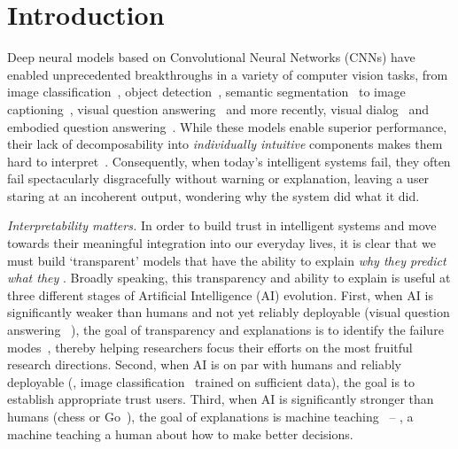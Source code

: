 \vspace{-15pt}
\section{Introduction}
Deep neural models based on Convolutional Neural Networks (CNNs)
have enabled unprecedented breakthroughs in a variety of computer vision tasks, from image
classification~\cite{krizhevsky_nips12,he_cvpr15}, object detection~\cite{girshick2014rcnn}, semantic segmentation~\cite{long2015fcn} to image captioning~\cite{vinyals_cvpr15,chen2015microsoft,fang2015captions,johnson_cvpr16}, visual question answering~\cite{antol2015vqa,gao2015you,malinowski_iccv15,ren_nips15}
and more recently, visual dialog~\cite{visdial,guesswhat,visdial_rl} and
embodied question answering~\cite{embodiedqa,gordon2017iqa}.
While these models enable superior performance, their lack of decomposability into
\emph{individually intuitive} components makes them hard to interpret~\cite{lipton_arxiv16}.
Consequently, when today's intelligent systems fail, they often fail spectacularly disgracefully
without warning or explanation, leaving a user staring at an incoherent output, wondering why the system did what it did.  %


\emph{Interpretability matters.}
In order to build trust in intelligent systems and move towards their meaningful
integration into our everyday lives,
it is clear that we must build `transparent' models that have the ability to
explain \emph{why they predict what they }.
Broadly speaking, this transparency and ability to explain is useful at three different stages of Artificial Intelligence (AI) evolution.
First, when AI is significantly weaker than humans and not yet reliably deployable (\eg visual question
answering ~\cite{antol2015vqa}), the goal of transparency and explanations is to identify the failure
modes~\cite{agrawal2016analyzing,hoiem2012diagnosing}, thereby helping researchers focus their
efforts on the most fruitful research directions.
Second, when AI is on par with humans and reliably deployable (\eg, image classification~\cite{karpathy_imagenet}
trained on sufficient data), the goal
is to establish appropriate trust  users.
Third, when AI is significantly stronger than humans (\eg chess or Go~\cite{silver2016mastering}),
the goal of explanations is  machine teaching~\cite{JohnsCVPR2015} -- \ie, a
machine teaching a human about how to make better decisions.%




